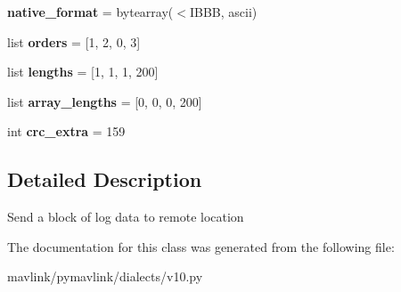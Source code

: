 \begin{DoxyCompactItemize}
\item 
\mbox{\label{classpymavlink_1_1dialects_1_1v10_1_1MAVLink__remote__log__data__block__message_ac616b26bbd24dfc2b0cb19b8ab8bd333}} 
{\bfseries native\+\_\+format} = bytearray(\textquotesingle{}$<$I\+B\+BB\textquotesingle{}, \textquotesingle{}ascii\textquotesingle{})
\item 
\mbox{\label{classpymavlink_1_1dialects_1_1v10_1_1MAVLink__remote__log__data__block__message_a8465e6a2de8e545cba5b478a5c327bd6}} 
list {\bfseries orders} = \mbox{[}1, 2, 0, 3\mbox{]}
\item 
\mbox{\label{classpymavlink_1_1dialects_1_1v10_1_1MAVLink__remote__log__data__block__message_a82e6fbb8d84c781f3cbed002a6fd468f}} 
list {\bfseries lengths} = \mbox{[}1, 1, 1, 200\mbox{]}
\item 
\mbox{\label{classpymavlink_1_1dialects_1_1v10_1_1MAVLink__remote__log__data__block__message_aeba37b0d44603434b5ddf10584e44459}} 
list {\bfseries array\+\_\+lengths} = \mbox{[}0, 0, 0, 200\mbox{]}
\item 
\mbox{\label{classpymavlink_1_1dialects_1_1v10_1_1MAVLink__remote__log__data__block__message_a047da7bf4730fac4ef5b92da530566da}} 
int {\bfseries crc\+\_\+extra} = 159
\end{DoxyCompactItemize}


\subsection{Detailed Description}
\begin{DoxyVerb}Send a block of log data to remote location
\end{DoxyVerb}
 

The documentation for this class was generated from the following file\+:\begin{DoxyCompactItemize}
\item 
mavlink/pymavlink/dialects/v10.\+py\end{DoxyCompactItemize}
